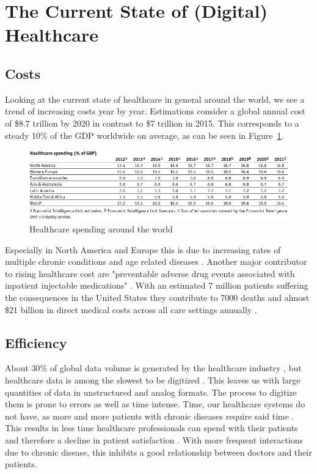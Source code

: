 \section{The Current State of (Digital) Healthcare}
\subsection{Costs}
Looking at the current state of healthcare in general around the world, we see a trend of increasing costs year by year. Estimations consider a global annual cost of \$8.7 trillion by 2020 in contrast to \$7 trillion in 2015. This corresponds to a steady 10\% of the GDP worldwide on average, as can be seen in Figure~\ref{fig:GDPSpendingHC}.
\begin{figure}[htpb]
    \centering
    \includegraphics[width=\linewidth]{media/Screenshot_2020-01-09_01_FULL_REPORT-World_healthcare_and.png}
    \caption{Healthcare spending around the world \cite{EIU2016}}%
    \label{fig:GDPSpendingHC}
\end{figure}
Especially in North America and Europe this is due to increasing rates of multiple chronic conditions and age related diseases \cite{sambamoorthi2015multiple}. Another major contributor to rising healthcare cost are "preventable adverse drug events associated with inpatient injectable medications" \cite{lahue2012national}. With an estimated 7 million patients suffering the consequences in the United States they contribute to 7000 deaths and almost \$21 billion in direct medical costs across all care settings annually \cite{prevMedErrors}.
\subsection{Efficiency}
About 30\% of global data volume is generated by the healthcare industry \cite{gopal2019digital}, but healthcare data is among the slowest to be digitized \cite{industryDigitalization}. This leaves us with large quantities of data in unstructured and analog formats. The process to digitize them is prone to errors as well as time intense. Time, our healthcare systems do not have, as more and more patients with chronic diseases require said time \cite{ostbye2005there}. This results in less time healthcare professionals can spend with their patients \cite{fuchtbauer2013emergency} and therefore a decline in patient satisfaction \cite{gross1998patient}. With more frequent interactions due to chronic disease, this inhibits a good relationship between doctors and their patients.
